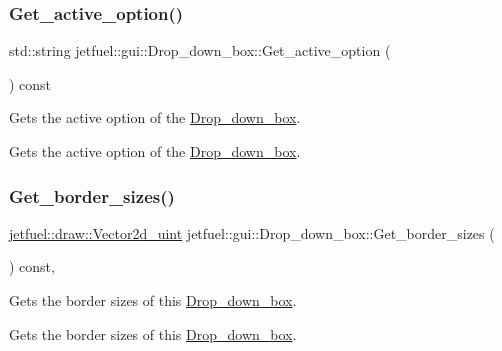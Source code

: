 \subsubsection{\texorpdfstring{Get\+\_\+active\+\_\+option()}{Get\_active\_option()}}
{\footnotesize\ttfamily std\+::string jetfuel\+::gui\+::\+Drop\+\_\+down\+\_\+box\+::\+Get\+\_\+active\+\_\+option (\begin{DoxyParamCaption}{ }\end{DoxyParamCaption}) const\hspace{0.3cm}{\ttfamily [inline]}}



Gets the active option of the \hyperlink{classjetfuel_1_1gui_1_1Drop__down__box}{Drop\+\_\+down\+\_\+box}. 

Gets the active option of the \hyperlink{classjetfuel_1_1gui_1_1Drop__down__box}{Drop\+\_\+down\+\_\+box}. \mbox{\label{classjetfuel_1_1gui_1_1Drop__down__box_a2164954ae3befe20f57d4fde86e13f15}} 
\subsubsection{\texorpdfstring{Get\+\_\+border\+\_\+sizes()}{Get\_border\_sizes()}}
{\footnotesize\ttfamily \hyperlink{classjetfuel_1_1draw_1_1Vector2d}{jetfuel\+::draw\+::\+Vector2d\+\_\+uint} jetfuel\+::gui\+::\+Drop\+\_\+down\+\_\+box\+::\+Get\+\_\+border\+\_\+sizes (\begin{DoxyParamCaption}{ }\end{DoxyParamCaption}) const\hspace{0.3cm}{\ttfamily [inline]}, {\ttfamily [protected]}}



Gets the border sizes of this \hyperlink{classjetfuel_1_1gui_1_1Drop__down__box}{Drop\+\_\+down\+\_\+box}. 

Gets the border sizes of this \hyperlink{classjetfuel_1_1gui_1_1Drop__down__box}{Drop\+\_\+down\+\_\+box}. \mbox{\label{classjetfuel_1_1gui_1_1Drop__down__box_a2635b1bb1d02c27bafbb91c03d312d91}} 
